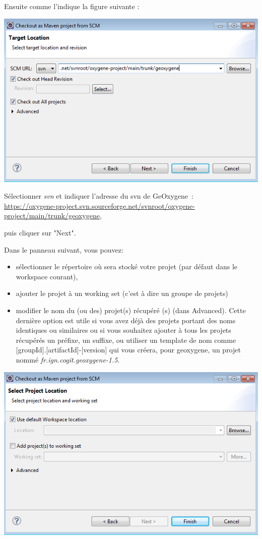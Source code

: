 \newpage

\noindent
Ensuite comme l'indique la figure suivante :

\begin{center}
\includegraphics[width=0.5\linewidth]{../../resources/images/guide_installation/geoxygeneEtape3.png}
\end{center}

\noindent
Sélectionner \emph{svn} et indiquer l'adresse du svn de GeOxygene~:\\
\href{https://oxygene-project.svn.sourceforge.net/svnroot/oxygene-project/main/trunk/geoxygene}{https://oxygene-project.svn.sourceforge.net/svnroot/oxygene-project/main/trunk/geoxygene}, 

\bigskip

\noindent
puis cliquer sur "Next".

\bigskip

\noindent
Dans le panneau suivant, vous pouvez:
\begin{itemize}[label=--, leftmargin=* ,parsep=0cm,itemsep=0cm,topsep=0cm]
\item sélectionner le répertoire où sera stocké votre projet (par défaut dans le workspace courant), 
\item ajouter le projet à un working set (c'est à dire un groupe de projets)
\item modifier le nom du (ou des) projet(s) récupéré (s) (dans Advanced). Cette dernière option est utile si vous avez déjà des projets portant des noms identiques ou similaires ou si vous souhaitez ajouter à tous les projets récupérés un préfixe, un suffixe, ou utiliser un template de nom comme [groupId].[artifactId]-[version] qui vous créera, pour geoxygene, un projet nommé \emph{fr.ign.cogit.geoxygene-1.5}.
\end{itemize}

\begin{center}
\includegraphics[width=0.5\linewidth]{../../resources/images/guide_installation/geoxygeneEtape4.png}
\end{center}

